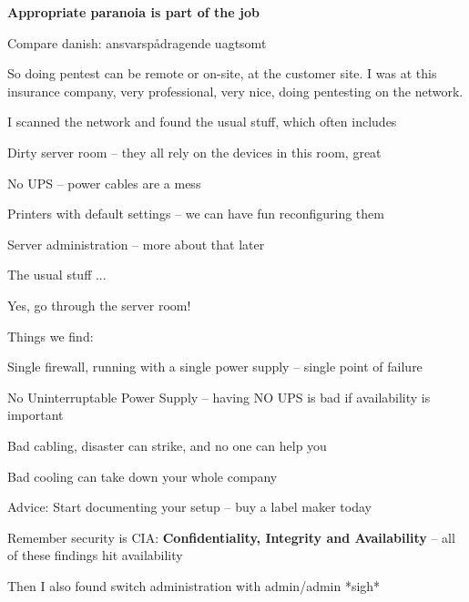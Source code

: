 \documentclass[Screen16to9,17pt]{foils}
\begin{document}
\centerline{\bf Appropriate paranoia is part of the job}

Compare danish: ansvarspådragende uagtsomt



So doing pentest can be remote or on-site, at the customer site. I was at this insurance company, very professional, very nice, doing pentesting on the network.

I scanned the network and found the usual stuff, which often includes
\begin{list2}
\item Dirty server room -- they all rely on the devices in this room, great
\item No UPS -- power cables are a mess
\item Printers with default settings -- we can have fun reconfiguring them
\item Server administration -- more about that later
\end{list2}

The usual stuff ...





Yes, go through the server room!

Things we find:
\begin{list2}
\item Single firewall, running with a single power supply -- single point of failure
\item No Uninterruptable Power Supply -- having NO UPS is bad if availability is important
\item Bad cabling, disaster can strike, and no one can help you
\item Bad cooling can take down your whole company
\end{list2}

Advice: Start documenting your setup -- buy a label maker today

Remember security is CIA: {\bf Confidentiality, Integrity and Availability} -- all of these findings hit availability


Then I also found switch administration with admin/admin *sigh*
\end{document}
